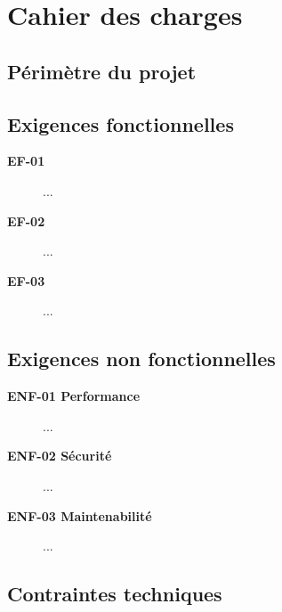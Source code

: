 \section{Cahier des charges}
\label{sec:cdc}


\subsection{Périmètre du projet}

\subsection{Exigences fonctionnelles}

\begin{description}
  \item[\textbf{EF-01}] ...
  \item[\textbf{EF-02}] ...
  \item[\textbf{EF-03}] ...
\end{description}

\subsection{Exigences non fonctionnelles}

\begin{description}
  \item[\textbf{ENF-01 Performance}] ...
  \item[\textbf{ENF-02 Sécurité}] ...
  \item[\textbf{ENF-03 Maintenabilité}] ...
\end{description}

\subsection{Contraintes techniques}
